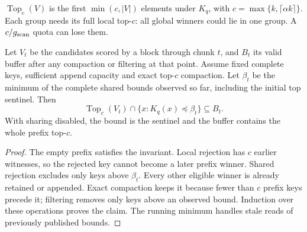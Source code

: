 $\operatorname{Top}_c(V)$ is the first $\min(c,|V|)$ elements under $K_q$, with $c=\max\{k,\lceil\alpha k\rceil\}$. Each group needs its full local top-$c$: all global winners could lie in one group. A $c/g_{\mathrm{scan}}$ quota can lose them.

\begin{resultblock}
\begin{lemma}
\label{lem:5-buffer}
Let $V_t$ be the candidates scored by a block through chunk $t$, and
$B_t$ its valid buffer after any compaction or filtering at that point.
Assume fixed complete keys, sufficient append capacity and exact
top-$c$ compaction. Let $\beta_t$ be the minimum of the complete shared
bounds observed so far, including the initial top sentinel. Then
\begin{equation}
 \operatorname{Top}_c(V_t)\cap\{x:K_q(x)\preceq\beta_t\}
 \subseteq B_t.
 \label{eq:5-buffer-invariant}
\end{equation}
With sharing disabled, the bound is the sentinel and the buffer contains
the whole prefix top-$c$.
\end{lemma}
\begin{proof}
The empty prefix satisfies the invariant. Local rejection has $c$ earlier witnesses, so the rejected key cannot become a later prefix winner. Shared rejection excludes only keys above $\beta_t$. Every other eligible winner is already retained or appended. Exact compaction keeps it because fewer than $c$ prefix keys precede it; filtering removes only keys above an observed bound. Induction over these operations proves the claim. The running minimum handles stale reads of previously published bounds.
\end{proof}
\end{resultblock}

